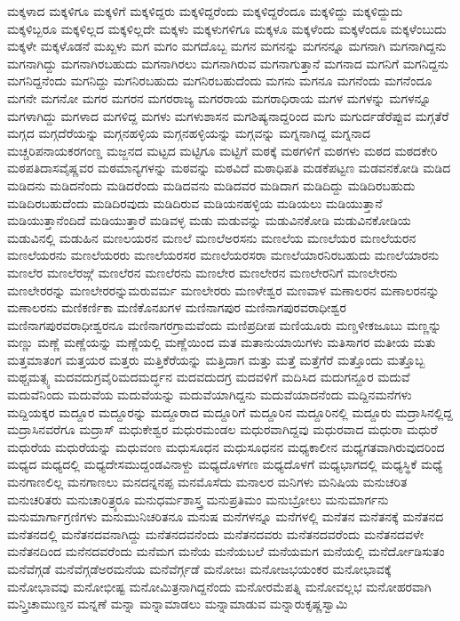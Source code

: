 {ಮಕ್ಕಳಾದ
ಮಕ್ಕಳಿಗೂ
ಮಕ್ಕಳಿಗೆ
ಮಕ್ಕಳಿದ್ದರು
ಮಕ್ಕಳಿದ್ದರೆಂದು
ಮಕ್ಕಳಿದ್ದರೆಂದೂ
ಮಕ್ಕಳಿದ್ದು
ಮಕ್ಕಳಿದ್ದುದು
ಮಕ್ಕಳಿಬ್ಬರೂ
ಮಕ್ಕಳಿಲ್ಲದ
ಮಕ್ಕಳಿಲ್ಲದೇ
ಮಕ್ಕಳು
ಮಕ್ಕಳುಗಳಿಗೂ
ಮಕ್ಕಳೂ
ಮಕ್ಕಳೆಂದು
ಮಕ್ಕಳೆಂದೂ
ಮಕ್ಕಳೆಂಬುದು
ಮಕ್ಕಳೇ
ಮಕ್ಕಳೊಡನೆ
ಮಖ್ಖಳು
ಮಗ
ಮಗಂ
ಮಗದೊಬ್ಬ
ಮಗನ
ಮಗನನ್ನು
ಮಗನನ್ನೂ
ಮಗನಾಗಿ
ಮಗನಾಗಿದ್ದನು
ಮಗನಾಗಿದ್ದು
ಮಗನಾಗಿರಬಹುದು
ಮಗನಾಗಿರಲು
ಮಗನಾಗಿರುವ
ಮಗನಾಗುತ್ತಾನೆ
ಮಗನಾದ
ಮಗನಿಗೆ
ಮಗನಿದ್ದನು
ಮಗನಿದ್ದನೆಂದು
ಮಗನಿದ್ದು
ಮಗನಿರಬಹುದು
ಮಗನಿರಬಹುದೆಂದು
ಮಗನು
ಮಗನೂ
ಮಗನೆಂದು
ಮಗನೆಂದೂ
ಮಗನೇ
ಮಗನೋ
ಮಗರ
ಮಗರನ
ಮಗರರಾಜ್ಯ
ಮಗರರಾಯ
ಮಗರಾಧಿರಾಯ
ಮಗಳ
ಮಗಳನ್ನು
ಮಗಳನ್ನೂ
ಮಗಳಾಗಿದ್ದು
ಮಗಳಾದ
ಮಗಳಿದ್ದ
ಮಗಳು
ಮಗಳುಶಾಸನ
ಮಗಶಿಷ್ಯನಾದ್ದರಿಂದ
ಮಗು
ಮಗುರ್ದಡೆರೆಪ್ಪುವ
ಮಗ್ಗತೆರೆ
ಮಗ್ಗದ
ಮಗ್ಗದೆರೆಯನ್ನು
ಮಗ್ಗನಹಳ್ಳಿಯ
ಮಗ್ಗನಹಳ್ಳಿಯನ್ನು
ಮಗ್ಗವನ್ನು
ಮಗ್ನನಾಗಿದ್ದ
ಮಗ್ನನಾದ
ಮಚ್ಚರಿಪನಾಯಕರಗಂಣ್ಡ
ಮಜ್ಜನದ
ಮಟ್ಟದ
ಮಟ್ಟಿಗೂ
ಮಟ್ಟಿಗೆ
ಮಠಕ್ಕೆ
ಮಠಗಳಿಗೆ
ಮಠಗಳು
ಮಠದ
ಮಠದಕೇರಿ
ಮಠಪತಿದಾಸವೈಷ್ಣವರ
ಮಠಮಾನ್ಯಗಳನ್ನು
ಮಠವನ್ನು
ಮಠವಿದೆ
ಮಠಾಧಿಪತಿ
ಮಡಕೆಪಟ್ಟಣ
ಮಡವನಕೋಡಿ
ಮಡಿದ
ಮಡಿದನು
ಮಡಿದನೆಂದು
ಮಡಿದರೆಂದು
ಮಡಿದವನು
ಮಡಿದವರ
ಮಡಿದಾಗ
ಮಡಿದಿದ್ದು
ಮಡಿದಿರಬಹುದು
ಮಡಿದಿರಬಹುದೆಂದು
ಮಡಿದಿರವುದು
ಮಡಿದಿರುವ
ಮಡಿಯನಹಳ್ಳಿಯ
ಮಡಿಯಲು
ಮಡಿಯುತ್ತಾನೆ
ಮಡಿಯುತ್ತಾನೆಂದಿದೆ
ಮಡಿಯುತ್ತಾರೆ
ಮಡಿವಳ್ಳ
ಮಡು
ಮಡುವನ್ನು
ಮಡುವಿನಕೋಡಿ
ಮಡುವಿನಕೋಡಿಯ
ಮಡುವಿನಲ್ಲಿ
ಮಡುಹಿನ
ಮಣಲಯರನ
ಮಣಲೆ
ಮಣಲೆಅರಸನು
ಮಣಲೆಯ
ಮಣಲೆಯರ
ಮಣಲೆಯರನ
ಮಣಲೆಯರನು
ಮಣಲೆಯರರು
ಮಣಲೆಯರಸರ
ಮಣಲೆಯರಸರಾ
ಮಣಲೆಯಾರನಿರಬಹುದು
ಮಣಲೆಯಾರನು
ಮಣಲೆರ
ಮಣಲೆರಙ್ಗೆ
ಮಣಲೆರನ
ಮಣಲೆರನು
ಮಣಲೇರ
ಮಣಲೇರನ
ಮಣಲೇರನಿಗೆ
ಮಣಲೇರನು
ಮಣಲೇರರನ್ನು
ಮಣಲೇರರನ್ನುಮರುವರ್ಮ
ಮಣಲೇರರು
ಮಣಳೇಶ್ವರ
ಮಣವಾಳ
ಮಣಾಲರನ
ಮಣಾಲರನನ್ನು
ಮಣಾಲರನು
ಮಣಿಕರ್ಣಿಕಾ
ಮಣಿಕೊನಖಗಳ
ಮಣಿನಾಗಪುರ
ಮಣಿನಾಗಪುರವರಾಧೀಶ್ವರ
ಮಣಿನಾಗಪುರವರಾಧೀಶ್ವರನೂ
ಮಣಿನಾಗರಗ್ರಾಮವೆಂದು
ಮಣಿಪ್ರದೀಪ
ಮಣಿಯೂರು
ಮಣ್ಡಳೀಕಜೂಬು
ಮಣ್ಣನ್ನು
ಮಣ್ಣು
ಮಣ್ಣೆ
ಮಣ್ಣೆಯನ್ನು
ಮಣ್ಣೆಯಲ್ಲಿ
ಮಣ್ಣೆಯಿಂದ
ಮತ
ಮತಾನುಯಾಯಿಗಳು
ಮತಿಸಾಗರ
ಮತೀಯ
ಮತು
ಮತ್ತಮಾತಂಗ
ಮತ್ತಯರ
ಮತ್ತರು
ಮತ್ತಿಕೆರೆಯನ್ನು
ಮತ್ತಿದಾಗ
ಮತ್ತು
ಮತ್ತೆ
ಮತ್ತೆಗೆರೆ
ಮತ್ತೊಂದು
ಮತ್ತೊಬ್ಬ
ಮಥ್ಚಮತ್ಸ್ಯ
ಮದವದುಗ್ರವೈರಿಮದಮರ್ದ್ಧನ
ಮದವದುದಗ್ರ
ಮದವಳಿಗೆ
ಮದಿಸಿದ
ಮದುಗನ್ದೂರ
ಮದುವೆ
ಮದುವೆನಿಂದು
ಮದುವೆಯ
ಮದುವೆಯನ್ನು
ಮದುವೆಯಾಗಿದ್ದನು
ಮದುವೆಯಾದನೆಂದು
ಮದ್ದಿನಮನೆಗಳು
ಮದ್ದಿಯಕ್ಕರ
ಮದ್ದೂರ
ಮದ್ದೂರನ್ನು
ಮದ್ದೂರಾದ
ಮದ್ದೂರಿಗೆ
ಮದ್ದೂರಿನ
ಮದ್ದೂರಿನಲ್ಲಿ
ಮದ್ದೂರು
ಮದ್ರಾಸಿನಲ್ಲಿದ್ದ
ಮದ್ರಾಸಿನವರೆಗೂ
ಮದ್ರಾಸ್
ಮಧುಕೇಶ್ವರ
ಮಧುರಮಂಡಲ
ಮಧುರವಾಗಿದ್ದವು
ಮಧುರವಾದ
ಮಧುರಾ
ಮಧುರೆ
ಮಧುರೆಯ
ಮಧುರೆಯನ್ನು
ಮಧುವಂಣ
ಮಧುಸೂಧನ
ಮಧುಸೂಧನನ
ಮಧ್ಯಕಾಲೀನ
ಮಧ್ಯಗತವಾಗಿರುವುದರಿಂದ
ಮಧ್ಯದ
ಮಧ್ಯದಲ್ಲಿ
ಮಧ್ಯದೇಸಮುದ್ದಂಡವಿನಾಳ್ದು
ಮಧ್ಯದೊಳಗಣ
ಮಧ್ಯದೊಳಗೆ
ಮಧ್ಯಭಾಗದಲ್ಲಿ
ಮಧ್ಯಸ್ಥಿಕೆ
ಮಧ್ಯೆ
ಮನಗಾಣಲಿಲ್ಲ
ಮನಗಾಣಲು
ಮನದನ್ನನಪ್ಪ
ಮನಮೊಸೆದು
ಮನಾಲರ
ಮನಿಗಳು
ಮನಿಷಿಯ
ಮನುಚರಿತ
ಮನುಚರಿತರು
ಮನುಚಾರಿತ್ರ್ಯರೂ
ಮನುಧರ್ಮಶಾಸ್ತ್ರ
ಮನುಪ್ರತಿಮಂ
ಮನುಬ್ರೋಲು
ಮನುಮಾರ್ಗನು
ಮನುಮಾರ್ಗಾಗ್ರಣಿಗಳು
ಮನುಮುನಿಚರಿತನೂ
ಮನುಷ
ಮನೆಗಳನ್ನೂ
ಮನೆಗಳಲ್ಲಿ
ಮನೆತನ
ಮನೆತನಕ್ಕೆ
ಮನೆತನದ
ಮನೆತನದಲ್ಲಿ
ಮನೆತನದವನಾಗಿದ್ದು
ಮನೆತನದವನೆಂದು
ಮನೆತನದವರು
ಮನೆತನದವರೆಂದು
ಮನೆತನದವಳೇ
ಮನೆತನದಿಂದ
ಮನೆನದವರೆಂದು
ಮನೆಮಗ
ಮನೆಯ
ಮನೆಯಬಲೆ
ಮನೆಯಮಗ
ಮನೆಯಲ್ಲಿ
ಮನೆರ್ದೋಡಿಸುತಂ
ಮನೆವೆಗ್ಗಡೆ
ಮನೆವೆಗ್ಗಡೆಅರಮನೆಯ
ಮನೆವೆರ್ಗ್ಗಡೆ
ಮನೋಜಃ
ಮನೋಜಭಯಂಕರ
ಮನೋಭಾವಕ್ಕೆ
ಮನೋಭಾವವು
ಮನೋಭೀಷ್ಟ
ಮನೋಮಿತ್ರನಾಗಿದ್ದನೆಂದು
ಮನೋರಮೆಪತ್ನಿ
ಮನೋವಲ್ಲಭ
ಮನೋಹರವಾಗಿ
ಮನ್ತ್ರಿಚಾಮುಣ್ಡನ
ಮನ್ನಣೆ
ಮನ್ನಾ
ಮನ್ನಾಮಾಡಲು
ಮನ್ನಾಮಾಡುವ
ಮನ್ನಾರುಕೃಷ್ಣಸ್ವಾಮಿ
}
